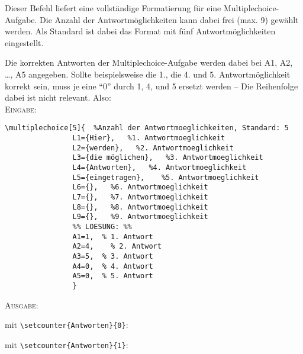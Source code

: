 \documentclass[a4paper,12pt]{article}
\begin{document}
Dieser Befehl liefert eine vollständige Formatierung für eine Multiplechoice-Aufgabe. Die Anzahl der Antwortmöglichkeiten kann dabei frei (max. 9) gewählt werden. Als Standard ist dabei das Format mit fünf Antwortmöglichkeiten eingestellt. \leer

Die korrekten Antworten der Multiplechoice-Aufgabe werden dabei bei A1, A2, \ldots, A5 angegeben. Sollte beispielsweise die 1., die 4. und 5. Antwortmöglichkeit korrekt sein, muss je eine "`0"' durch 1, 4, und 5 ersetzt werden -- Die Reihenfolge dabei ist nicht relevant. Also: \\

\textsc{Eingabe:}

\begin{verbatim}
\multiplechoice[5]{  %Anzahl der Antwortmoeglichkeiten, Standard: 5
				L1={Hier},   %1. Antwortmoeglichkeit 
				L2={werden},   %2. Antwortmoeglichkeit
				L3={die möglichen},   %3. Antwortmoeglichkeit
				L4={Antworten},   %4. Antwortmoeglichkeit
				L5={eingetragen},	 %5. Antwortmoeglichkeit
				L6={},	 %6. Antwortmoeglichkeit
				L7={},	 %7. Antwortmoeglichkeit
				L8={},	 %8. Antwortmoeglichkeit
				L9={},	 %9. Antwortmoeglichkeit
				%% LOESUNG: %%
				A1=1,  % 1. Antwort
				A2=4,	 % 2. Antwort
				A3=5,  % 3. Antwort
				A4=0,  % 4. Antwort
				A5=0,  % 5. Antwort
				}
\end{verbatim}

\textsc{Ausgabe:}\vspace{0.2cm}

\begin{minipage}{8cm}
\setcounter{Antworten}{0}
mit \texttt{\textbackslash setcounter\{Antworten\}\{0\}}:
\begin{center}
\end{center}
\end{minipage} \hfill 
\begin{minipage}{8cm}
mit \texttt{\textbackslash setcounter\{Antworten\}\{1\}}:
\setcounter{Antworten}{1}
\begin{center}
\end{center}
\end{minipage}
\end{document}
